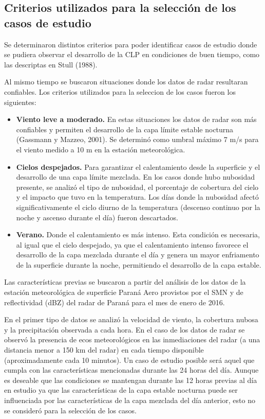 \documentclass[12pt,spanish,oneside, a4paper]{book}
\providecommand{\tightlist}{%
  \setlength{\itemsep}{0pt}\setlength{\parskip}{0pt}}
\begin{document}
\subsection{\texorpdfstring{Criterios utilizados para la selección de
los casos de estudio
\label{sec-criterios}}{Criterios utilizados para la selección de los casos de estudio }}\label{criterios-utilizados-para-la-seleccion-de-los-casos-de-estudio}

Se determinaron distintos criterios para poder identificar casos de
estudio donde se pudiera observar el desarrollo de la CLP en condiciones
de buen tiempo, como las descriptas en Stull (1988).

Al mismo tiempo se buscaron situaciones donde los datos de radar
resultaran confiables. Los criterios utilizados para la seleccion de los
casos fueron los siguientes:

\begin{itemize}
\tightlist
\item
  \textbf{Viento leve a moderado.} En estas situaciones los datos de
  radar son más confiables y permiten el desarrollo de la capa límite
  estable nocturna (Gassmann y Mazzeo, 2001). Se determinó como umbral
  máximo 7 m/s para el viento medido a 10 m en la estación
  meteorológica.
\item
  \textbf{Cielos despejados.} Para garantizar el calentamiento desde la
  superficie y el desarrollo de una capa límite mezclada. En los casos
  donde hubo nubosidad presente, se analizó el tipo de nubosidad, el
  porcentaje de cobertura del cielo y el impacto que tuvo en la
  temperatura. Los días donde la nubosidad afectó significativamente el
  ciclo diurno de la temperatura (descenso continuo por la noche y
  ascenso durante el día) fueron descartados.
\item
  \textbf{Verano.} Donde el calentamiento es más intenso. Esta condición
  es necesaria, al igual que el cielo despejado, ya que el calentamiento
  intenso favorece el desarrollo de la capa mezclada durante el día y
  genera un mayor enfriamento de la superficie durante la noche,
  permitiendo el desarrollo de la capa estable.
\end{itemize}

Las características previas se buscaron a partir del análisis de los
datos de la estación meteorológica de superficie Paraná Aero provistos
por el SMN y de reflectividad (dBZ) del radar de Paraná para el mes de
enero de 2016.

En el primer tipo de datos se analizó la velocidad de viento, la
cobertura nubosa y la precipitación observada a cada hora. En el caso de
los datos de radar se observó la presencia de ecos meteorológicos en las
inmediaciones del radar (a una distancia menor a 150 km del radar) en
cada tiempo disponible (aproximadamente cada 10 minutos). Un caso de
estudio posible será aquel que cumpla con las características
mencionadas durante las 24 horas del día. Aunque es deseable que las
condiciones se mantengan durante las 12 horas previas al día en estudio
ya que las características de la capa estable nocturna puede ser
influenciada por las características de la capa mezclada del día
anterior, esto no se consideró para la selección de los casos.
\end{document}
